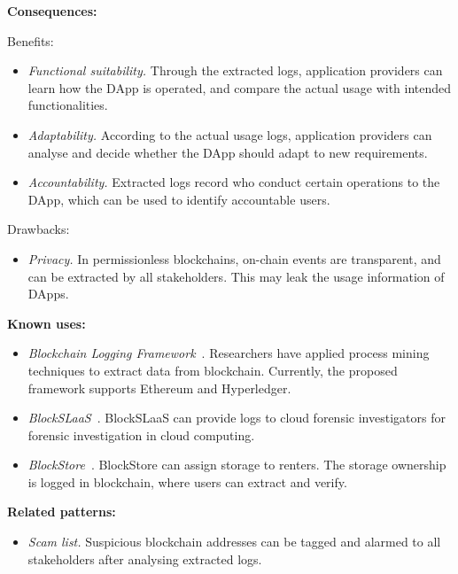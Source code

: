 \documentclass{article}
\begin{document}
\vspace{0.5em}\noindent \textbf{Consequences:} 

Benefits:
\begin{itemize}
  \item \textit{Functional suitability.} Through the extracted logs, application providers can learn how the DApp is operated, and compare the actual usage with intended functionalities.

  \item \textit{Adaptability.} According to the actual usage logs, application providers can analyse and decide whether the DApp should adapt to new requirements.
  
  \item \textit{Accountability.} Extracted logs record who conduct certain operations to the DApp, which can be used to identify accountable users.
\end{itemize}

Drawbacks:
\begin{itemize}
  \item \textit{Privacy.} In permissionless blockchains, on-chain events are transparent, and can be extracted by all stakeholders. This may leak the usage information of DApps.
\end{itemize}



\vspace{0.5em}\noindent \textbf{Known uses:}  
 \begin{itemize}
   \item \textit{Blockchain Logging Framework}~\cite{blockchain_logging_framework, Mining_Blockchain_Processes}. Researchers have applied process mining techniques to extract data from blockchain. Currently, the proposed framework supports Ethereum and Hyperledger.
   
    \item \textit{BlockSLaaS}~\cite{BlockSLaaS}. BlockSLaaS can provide logs to cloud forensic investigators for forensic investigation in cloud computing.
   
   \item \textit{BlockStore}~\cite{BlockStore}. BlockStore can assign storage to renters. The storage ownership is logged in blockchain, where users can extract and verify.
 \end{itemize}


\vspace{0.5em}\noindent \textbf{Related patterns:} 

\begin{itemize}
    \item \textit{Scam list.} Suspicious blockchain addresses can be tagged and alarmed to all stakeholders after analysing extracted logs.
\end{itemize}
\end{document}
